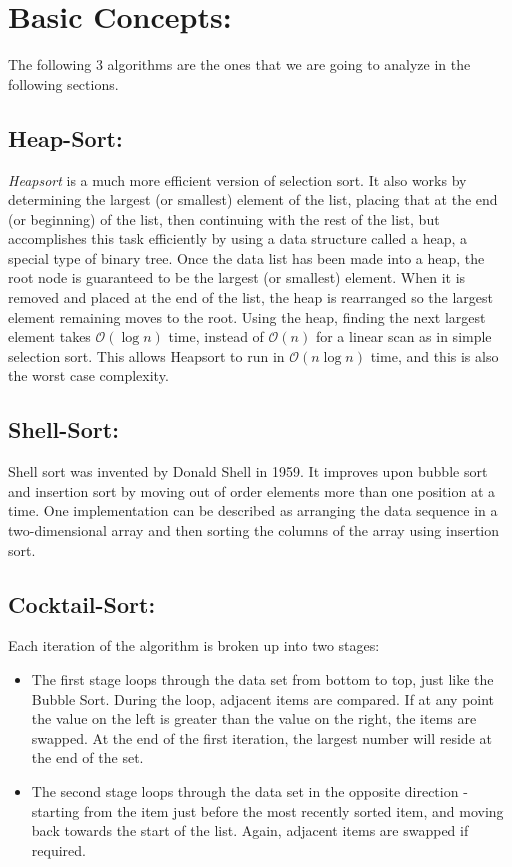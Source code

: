 \section{Basic Concepts:}

The following 3 algorithms are the ones that we are going to analyze in the following sections.

\subsection{Heap-Sort:}

{\itshape Heapsort} is a much more efficient version of selection sort. It also works by determining the largest (or smallest) element of the list, placing that at the end (or beginning) of the list, then continuing with the rest of the list, but accomplishes this task efficiently by using a data structure called a heap, a special type of binary tree. Once the data list has been made into a heap, the root node is guaranteed to be the largest (or smallest) element. When it is removed and placed at the end of the list, the heap is rearranged so the largest element remaining moves to the root. Using the heap, finding the next largest element takes {\bfseries $\mathcal{O}(\log{}n)$} time, instead of {\bfseries $\mathcal{O}(n)$} for a linear scan as in simple selection sort. This allows Heapsort to run in {\bfseries $\mathcal{O}(n\log{}n)$} time, and this is also the worst case complexity.

\subsection{Shell-Sort:}

Shell sort was invented by Donald Shell in 1959. It improves upon bubble sort and insertion sort by moving out of order elements more than one position at a time. One implementation can be described as arranging the data sequence in a two-dimensional array and then sorting the columns of the array using insertion sort.

\subsection{Cocktail-Sort:}

Each iteration of the algorithm is broken up into two stages: 

\begin{itemize}
\item The first stage loops through the data set from bottom to top, just like the Bubble Sort. During the loop, adjacent items are compared. If at any point the value on the left is greater than the value on the right, the items are swapped. At the end of the first iteration, the largest number will reside at the end of the set.

\item The second stage loops through the data set in the opposite direction - starting from the item just before the most recently sorted item, and moving back towards the start of the list. Again, adjacent items are swapped if required.
\end{itemize}

